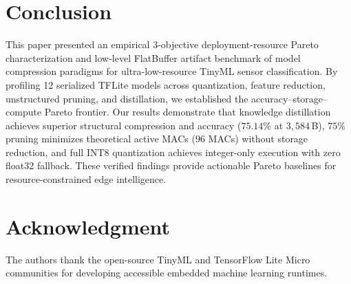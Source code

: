 \documentclass[journal,10pt]{IEEEtran}
\begin{document}
\section{Conclusion}
This paper presented an empirical 3-objective deployment-resource Pareto characterization and low-level FlatBuffer artifact benchmark of model compression paradigms for ultra-low-resource TinyML sensor classification. By profiling 12 serialized TFLite models across quantization, feature reduction, unstructured pruning, and distillation, we established the accuracy--storage--compute Pareto frontier. Our results demonstrate that knowledge distillation achieves superior structural compression and accuracy ($75.14\%$ at $3,584$\,B), $75\%$ pruning minimizes theoretical active MACs ($96$ MACs) without storage reduction, and full INT8 quantization achieves integer-only execution with zero float32 fallback. These verified findings provide actionable Pareto baselines for resource-constrained edge intelligence.

\section*{Acknowledgment}
The authors thank the open-source TinyML and TensorFlow Lite Micro communities for developing accessible embedded machine learning runtimes.



\end{document}
